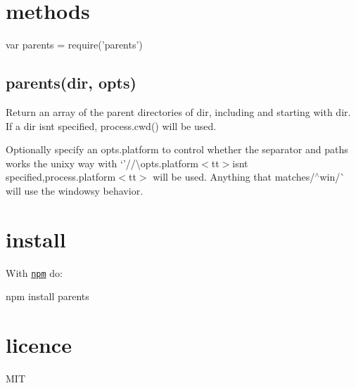 \section*{methods}


\begin{DoxyCode}
var parents = require('parents')
\end{DoxyCode}


\subsection*{parents(dir, opts)}

Return an array of the parent directories of {\ttfamily dir}, including and starting with {\ttfamily dir}. If a {\ttfamily dir} isn\textquotesingle{}t specified, {\ttfamily process.\+cwd()} will be used.

Optionally specify an {\ttfamily opts.\+platform} to control whether the separator and paths works the unixy way with `'/\textquotesingle{}/\textquotesingle{}\textbackslash{}opts.\+platform$<$tt$>$isn\textquotesingle{}t specified,process.\+platform$<$tt$>$ will be used. Anything that matches/$^\wedge$win/\`{} will use the windowsy behavior.

\section*{install}

With \href{http://npmjs.org}{\tt npm} do\+:


\begin{DoxyCode}
npm install parents
\end{DoxyCode}


\section*{licence}

M\+IT 